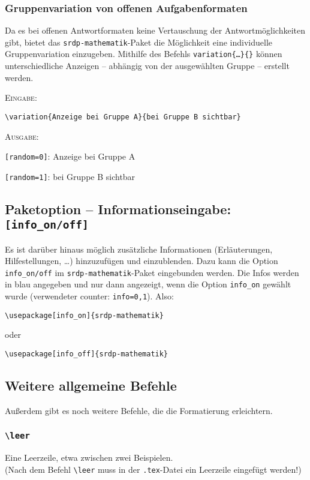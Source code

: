 \documentclass[a4paper,12pt]{article}
\begin{document}
\subsubsection{Gruppenvariation von offenen Aufgabenformaten}
Da es bei offenen Antwortformaten keine Vertauschung der Antwortmöglichkeiten gibt, bietet das \texttt{srdp-mathematik}-Paket die Möglichkeit eine individuelle Gruppenvariation einzugeben. Mithilfe des Befehls \texttt{variation\{\ldots\}\{\}} können unterschiedliche Anzeigen -- abhängig von der ausgewählten Gruppe -- erstellt werden.

\textsc{Eingabe:}
\begin{verbatim}
\variation{Anzeige bei Gruppe A}{bei Gruppe B sichtbar}
\end{verbatim}

\textsc{Ausgabe:}

\texttt{[random=0]}: Anzeige bei Gruppe A

\texttt{[random=1]}: bei Gruppe B sichtbar





\subsection{Paketoption -- Informationseingabe: \texttt{[info\_on/off]}}
Es ist darüber hinaus möglich zusätzliche Informationen (Erläuterungen, Hilfestellungen, \ldots) hinzuzufügen und einzublenden. Dazu kann die Option \texttt{info\_on/off} im \texttt{srdp-mathematik}-Paket eingebunden werden. Die Infos werden in \textcolor[rgb]{0,0,1}{blau} angegeben und nur dann angezeigt, wenn die Option \texttt{info\_on} gewählt wurde (verwendeter counter: \texttt{info=0,1}). Also:


\begin{verbatim}
\usepackage[info_on]{srdp-mathematik}
\end{verbatim}

oder

\begin{verbatim}
\usepackage[info_off]{srdp-mathematik}
\end{verbatim}

				
\subsection{Weitere allgemeine Befehle}
Außerdem gibt es noch weitere Befehle, die die Formatierung erleichtern. 

\subsubsection{\texttt{\textbackslash leer}}
Eine Leerzeile, etwa zwischen zwei Beispielen. \\
(Nach dem Befehl \texttt{\textbackslash leer} muss in der \texttt{.tex}-Datei ein Leerzeile eingefügt werden!) 
\end{document}
